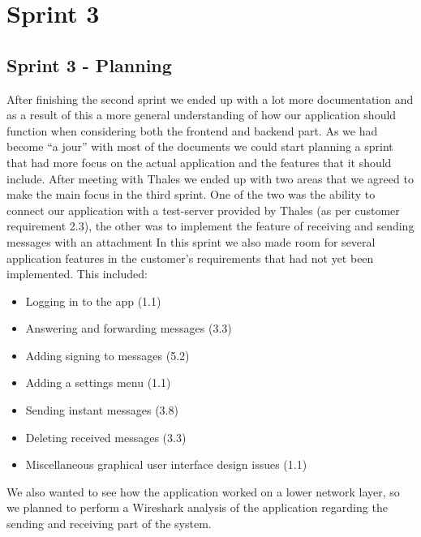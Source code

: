 \chapter{Sprint 3}

\section{Sprint 3 - Planning}
After finishing the second sprint we ended up with a lot more documentation and as a result of this a more general understanding of how our application should function when considering both the frontend and backend part. As we had become “a jour” with most of the documents we could start planning a sprint that had more focus on the actual application and the features that it should include. 
\newline
\newline
After meeting with Thales we ended up with two areas that we agreed to make the main focus in the third sprint. One of the two was the ability to connect our application with a test-server provided by Thales (as per customer requirement 2.3), the other was to implement the feature of receiving and sending messages with an attachment
\newline
\newline
In this sprint we also made room for several application features in the customer's requirements that had not yet been implemented. This included:
\begin{itemize}
\item{}Logging in to the app (1.1)
\item{}Answering and forwarding messages (3.3)
\item{}Adding signing to messages (5.2)
\item{}Adding a settings menu (1.1)
\item{}Sending instant messages (3.8)
\item{}Deleting received messages (3.3)
\item{}Miscellaneous graphical user interface design issues (1.1)
\end{itemize}

We also wanted to see how the application worked on a lower network layer, so we planned to perform a Wireshark analysis of the application regarding the sending and receiving part of the system. 

\newpage

